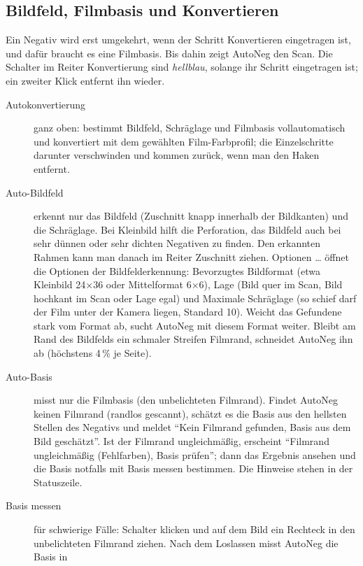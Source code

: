 \documentclass[a4paper,11pt,parskip=half,DIV=12]{scrartcl}
\newcommand{\menu}[1]{\textsf{#1}}                    %
\begin{document}
\subsection{Bildfeld, Filmbasis und Konvertieren}
Ein Negativ wird erst umgekehrt, wenn der Schritt \menu{Konvertieren} eingetragen ist, und
dafür braucht es eine Filmbasis. Bis dahin zeigt AutoNeg den Scan. Die Schalter im Reiter
\menu{Konvertierung} sind \emph{hellblau}, solange ihr Schritt eingetragen ist; ein zweiter
Klick entfernt ihn wieder.
\begin{description}
  \item[Autokonvertierung] ganz oben: bestimmt Bildfeld, Schräglage und Filmbasis
        vollautomatisch und konvertiert mit dem gewählten Film-Farbprofil; die Einzelschritte darunter verschwinden und kommen
        zurück, wenn man den Haken entfernt.
  \item[Auto-Bildfeld] erkennt nur das Bildfeld (Zuschnitt knapp innerhalb der Bildkanten) und
        die Schräglage. Bei Kleinbild hilft die Perforation, das Bildfeld auch bei sehr dünnen
        oder sehr dichten Negativen zu finden. Den erkannten Rahmen kann man danach im Reiter
        \menu{Zuschnitt} ziehen.
        \menu{Optionen …} öffnet die \menu{Optionen der Bildfelderkennung}:
        \menu{Bevorzugtes Bildformat} (etwa \menu{Kleinbild 24×36} oder \menu{Mittelformat
        6×6}), \menu{Lage} (\menu{Bild quer im Scan}, \menu{Bild hochkant im Scan} oder
        \menu{Lage egal}) und \menu{Maximale Schräglage} (so schief darf der Film unter der
        Kamera liegen, Standard 10\textdegree). Weicht das Gefundene stark vom Format ab, sucht
        AutoNeg mit diesem Format weiter.
        Bleibt am Rand des Bildfelds ein schmaler Streifen Filmrand, schneidet AutoNeg ihn ab
        (höchstens 4\,\% je Seite).
  \item[Auto-Basis] misst nur die Filmbasis (den unbelichteten Filmrand). Findet AutoNeg keinen
        Filmrand (randlos gescannt), schätzt es die Basis aus den hellsten Stellen des
        Negativs und meldet \enquote{Kein Filmrand gefunden, Basis aus dem Bild geschätzt}.
        Ist der Filmrand ungleichmäßig, erscheint \enquote{Filmrand ungleichmäßig
        (Fehlfarben), Basis prüfen}; dann das Ergebnis ansehen und die Basis notfalls mit
        \menu{Basis messen} bestimmen. Die Hinweise stehen in der Statuszeile.
  \item[Basis messen] für schwierige Fälle: Schalter klicken und auf dem Bild ein Rechteck
        in den unbelichteten Filmrand ziehen. Nach dem Loslassen misst AutoNeg die Basis in

\end{description}
\end{document}
